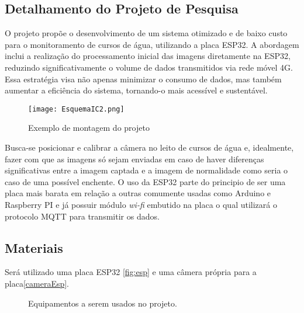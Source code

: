 \documentclass[12pt]{article}
\begin{document}
\begin{spacing}{1}

\section{Detalhamento do Projeto de Pesquisa}

O projeto propõe o desenvolvimento de um sistema otimizado e de baixo custo para o monitoramento de cursos de água, utilizando a placa ESP32. A abordagem inclui a realização do processamento inicial das imagens diretamente na ESP32, reduzindo significativamente o volume de dados transmitidos via rede móvel 4G. Essa estratégia visa não apenas minimizar o consumo de dados, mas também aumentar a eficiência do sistema, tornando-o mais acessível e sustentável.

\begin{figure}[!htb]
\centering
\texttt{[image: EsquemaIC2.png]}
\vspace{-0.2cm}
\caption{Exemplo de montagem do projeto}
\label{1}
\vspace{-0.3cm}
\end{figure}

\FloatBarrier

Busca-se posicionar e calibrar a câmera no leito de cursos de água e, idealmente, fazer com que as imagens só sejam enviadas em caso de haver diferenças significativas entre a imagem captada e a imagem de normalidade como seria o caso de uma possível enchente. O uso da ESP32 parte do principio de ser uma placa mais barata em relação a outras comumente usadas como Arduino e Raspberry PI e já possuir módulo \textit{wi-fi} embutido na placa o qual utilizará o protocolo MQTT para transmitir os dados.

\subsection{Materiais}
Será utilizado uma placa ESP32 \ref{fig:esp} e uma câmera própria para a placa\ref{cameraEsp}.



\begin{figure}[htb]
\centering
     \hspace{18px}
    \caption{Equipamentos a serem usados no projeto.}
    \label{fig:imagem-barra}
\end{figure}


\end{spacing}
\end{document}
